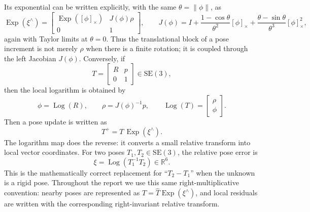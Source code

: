 \documentclass[11pt]{report}
\newcommand{\SE}{\mathrm{SE}(3)}
\newcommand{\R}{\mathbb{R}}
\newcommand{\Exp}{\operatorname{Exp}}
\newcommand{\Log}{\operatorname{Log}}
\newcommand{\norm}[1]{\left\lVert #1 \right\rVert}
\begin{document}
Its exponential can be written explicitly, with the same $\theta=\norm{\phi}$, as
\begin{equation}
\Exp(\xi^\wedge)=
\begin{bmatrix}
\Exp([\phi]_{\times}) & J(\phi)\rho\\
0 & 1
\end{bmatrix},
\qquad
J(\phi)=I+\frac{1-\cos\theta}{\theta^2}[\phi]_{\times}
 +\frac{\theta-\sin\theta}{\theta^3}[\phi]_{\times}^2,
\label{eq:se3_exp_sweep}
\end{equation}
again with Taylor limits at $\theta=0$. Thus the translational block of a pose increment is not merely $\rho$ when there is a finite rotation; it is coupled through the left Jacobian $J(\phi)$. Conversely, if
\begin{equation}
T=\begin{bmatrix}R&p\\0&1\end{bmatrix}\in\SE,
\end{equation}
then the local logarithm is obtained by
\begin{equation}
\phi=\Log(R),\qquad \rho=J(\phi)^{-1}p,\qquad \Log(T)=\begin{bmatrix}\rho\\\phi\end{bmatrix}.
\label{eq:se3_log_sweep}
\end{equation}
Then a pose update is written as
\begin{equation}
T^+=T\,\Exp(\xi^\wedge).
\label{eq:pose_update_sweep}
\end{equation}
The logarithm map does the reverse: it converts a small relative transform into local vector coordinates. For two poses $T_1,T_2\in\SE$, the relative pose error is
\begin{equation}
\xi=\Log(T_1^{-1}T_2)\in\R^6.
\label{eq:relative_pose_error_log_sweep}
\end{equation}
This is the mathematically correct replacement for ``$T_2-T_1$'' when the unknown is a rigid pose. Throughout the report we use this same right-multiplicative convention: nearby poses are represented as $T=\widehat T\Exp(\xi^\wedge)$, and local residuals are written with the corresponding right-invariant relative transform.
\end{document}
